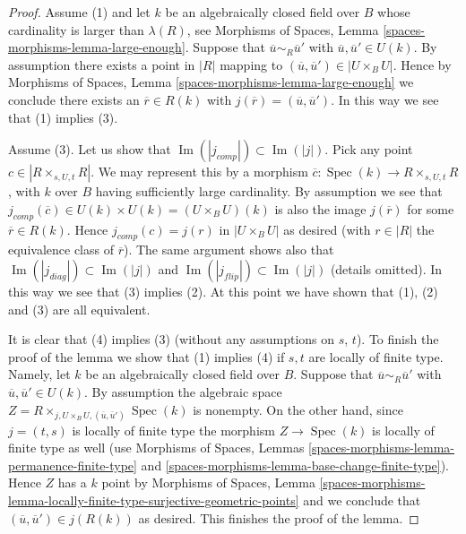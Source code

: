 \documentclass{stacks-project}
\theoremstyle{plain}
\theoremstyle{definition}
\theoremstyle{remark}
\numberwithin{equation}{subsection}
\def\Spec{\mathop{\mathrm{Spec}}}
\def\Im{\mathop{\mathrm{Im}}}
\begin{document}
\begin{proof}
\medskip\noindent
Assume (1) and let $k$ be an algebraically closed field over $B$ whose
cardinality is larger than $\lambda(R)$, see
Morphisms of Spaces, Lemma \ref{spaces-morphisms-lemma-large-enough}.
Suppose that $\overline{u} \sim_R \overline{u}'$ with
$\overline{u}, \overline{u}' \in U(k)$. By assumption there exists
a point in $|R|$ mapping to $(\overline{u}, \overline{u}') \in |U \times_B U|$.
Hence by
Morphisms of Spaces, Lemma \ref{spaces-morphisms-lemma-large-enough}
we conclude there exists an $\overline{r} \in R(k)$ with
$j(\overline{r}) = (\overline{u}, \overline{u}')$. In this way we see
that (1) implies (3).

\medskip\noindent
Assume (3). Let us show that
$\Im(|j_{comp}|) \subset \Im(|j|)$. Pick any point
$c \in |R \times_{s, U, t} R|$. We may represent this by a morphism
$\overline{c} : \Spec(k) \to R \times_{s, U, t} R$, with $k$ over $B$
having sufficiently large cardinality. By assumption we see that
$j_{comp}(\overline{c}) \in U(k) \times U(k) = (U \times_B U)(k)$
is also the image $j(\overline{r})$ for some $\overline{r} \in R(k)$.
Hence $j_{comp}(c) = j(r)$ in $|U \times_B U|$ as desired (with
$r \in |R|$ the equivalence class of $\overline{r}$). The same argument
shows also that $\Im(|j_{diag}|) \subset \Im(|j|)$ and
$\Im(|j_{flip}|) \subset \Im(|j|)$ (details omitted).
In this way we see that (3) implies (2). At this point we have
shown that (1), (2) and (3) are all equivalent.

\medskip\noindent
It is clear that (4) implies (3) (without any assumptions on $s$, $t$).
To finish the proof of the lemma we show that (1) implies (4) if $s, t$
are locally of finite type. Namely, let $k$ be an algebraically closed
field over $B$. Suppose that $\overline{u} \sim_R \overline{u}'$ with
$\overline{u}, \overline{u}' \in U(k)$. By assumption the algebraic space
$Z = R \times_{j, U \times_B U, (\overline{u}, \overline{u}')} \Spec(k)$
is nonempty. On the other hand, since $j = (t, s)$ is locally of finite type
the morphism $Z \to \Spec(k)$ is locally of finite type as well (use
Morphisms of Spaces, Lemmas \ref{spaces-morphisms-lemma-permanence-finite-type}
and \ref{spaces-morphisms-lemma-base-change-finite-type}).
Hence $Z$ has a $k$ point by
Morphisms of Spaces, Lemma
\ref{spaces-morphisms-lemma-locally-finite-type-surjective-geometric-points}
and we conclude that $(\overline{u}, \overline{u}') \in j(R(k))$
as desired. This finishes the proof of the lemma.
\end{proof}
\end{document}

